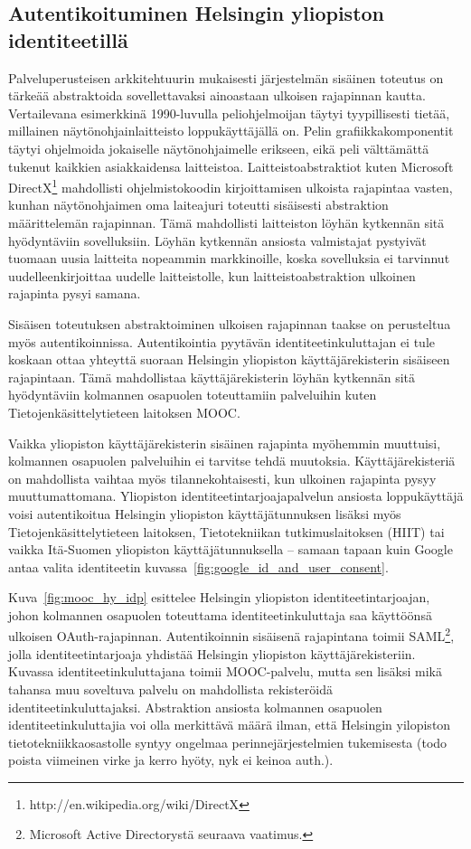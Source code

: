 \documentclass[finnish,gradu]{tktltiki}
\begin{document}
  \subsection{Autentikoituminen Helsingin yliopiston identiteetillä} %
  \label{sub:autentikointi_helsingin_yliopiston_id}

  Palveluperusteisen arkkitehtuurin mukaisesti järjestelmän sisäinen toteutus on tärkeää abstraktoida sovellettavaksi ainoastaan ulkoisen rajapinnan kautta. Vertailevana esimerkkinä 1990-luvulla peliohjelmoijan täytyi tyypillisesti tietää, millainen näytönohjainlaitteisto loppukäyttäjällä on. Pelin grafiikkakomponentit täytyi ohjelmoida jokaiselle näytönohjaimelle erikseen, eikä peli välttämättä tukenut kaikkien asiakkaidensa laitteistoa. Laitteistoabstraktiot kuten Microsoft DirectX\footnote{http://en.wikipedia.org/wiki/DirectX} mahdollisti ohjelmistokoodin kirjoittamisen ulkoista rajapintaa vasten, kunhan näytönohjaimen oma laiteajuri toteutti sisäisesti abstraktion määrittelemän rajapinnan. Tämä mahdollisti laitteiston löyhän kytkennän sitä hyödyntäviin sovelluksiin. Löyhän kytkennän ansiosta valmistajat pystyivät tuomaan uusia laitteita nopeammin markkinoille, koska sovelluksia ei tarvinnut uudelleenkirjoittaa uudelle laitteistolle, kun laitteistoabstraktion ulkoinen rajapinta pysyi samana.

  Sisäisen toteutuksen abstraktoiminen ulkoisen rajapinnan taakse on perusteltua myös autentikoinnissa. Autentikointia pyytävän identiteetinkuluttajan ei tule koskaan ottaa yhteyttä suoraan Helsingin yliopiston käyttäjärekisterin sisäiseen rajapintaan. Tämä mahdollistaa käyttäjärekisterin löyhän kytkennän sitä hyödyntäviin kolmannen osapuolen toteuttamiin palveluihin kuten Tietojenkäsittelytieteen laitoksen MOOC.

  Vaikka yliopiston käyttäjärekisterin sisäinen rajapinta myöhemmin muuttuisi, kolmannen osapuolen palveluihin ei tarvitse tehdä muutoksia. Käyttäjärekisteriä on mahdollista vaihtaa myös tilannekohtaisesti, kun ulkoinen rajapinta pysyy muuttumattomana. Yliopiston identiteetintarjoajapalvelun ansiosta loppukäyttäjä voisi autentikoitua Helsingin yliopiston käyttäjätunnuksen lisäksi myös Tietojenkäsittelytieteen laitoksen, Tietotekniikan tutkimuslaitoksen (HIIT) tai vaikka Itä-Suomen yliopiston käyttäjätunnuksella -- samaan tapaan kuin Google antaa valita identiteetin kuvassa~\ref{fig:google_id_and_user_consent}.

  Kuva~\ref{fig:mooc_hy_idp} esittelee Helsingin yliopiston identiteetintarjoajan, johon kolmannen osapuolen toteuttama identiteetinkuluttaja saa käyttöönsä ulkoisen OAuth-rajapinnan. Autentikoinnin sisäisenä rajapintana toimii SAML\footnote{Microsoft Active Directorystä seuraava vaatimus.}, jolla identiteetintarjoaja yhdistää Helsingin yliopiston käyttäjärekisteriin. Kuvassa identiteetinkuluttajana toimii MOOC-palvelu, mutta sen lisäksi mikä tahansa muu soveltuva palvelu on mahdollista rekisteröidä identiteetinkuluttajaksi.
  Abstraktion ansiosta kolmannen osapuolen identiteetinkuluttajia voi olla merkittävä määrä ilman, että Helsingin yilopiston tietotekniikkaosastolle syntyy ongelmaa perinnejärjestelmien tukemisesta (todo poista viimeinen virke ja kerro hyöty, nyk ei keinoa auth.).
\end{document}
